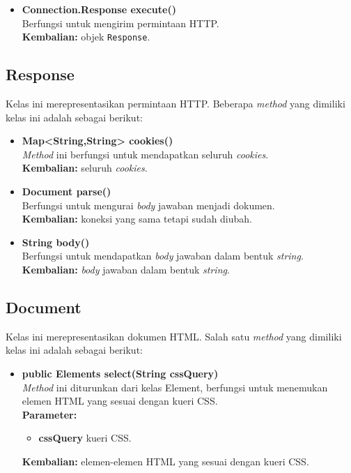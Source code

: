 \begin{itemize}
		\item \textbf{Connection.Response execute()} \\
		Berfungsi untuk mengirim permintaan HTTP.\\
		\textbf{Kembalian:} objek \texttt{Response}.	
\end{itemize}

\subsection{Response}

Kelas ini merepresentasikan permintaan HTTP. Beberapa \textit{method} yang dimiliki kelas ini adalah sebagai berikut:
\begin{itemize}
	\item \textbf{Map<String,String> cookies()} \\
		\textit{Method} ini berfungsi untuk mendapatkan seluruh \textit{cookies}. \\
		\textbf{Kembalian:} seluruh \textit{cookies}.	
		
		\item \textbf{Document parse()} \\
		Berfungsi untuk mengurai \textit{body} jawaban menjadi dokumen. \\
		\textbf{Kembalian:} koneksi yang sama tetapi sudah diubah.
		
		\item \textbf{String body()} \\
		Berfungsi untuk mendapatkan \textit{body} jawaban dalam bentuk \textit{string}. \\
		\textbf{Kembalian:} \textit{body} jawaban dalam bentuk \textit{string}.
\end{itemize}

\subsection{Document}

Kelas ini merepresentasikan dokumen HTML. Salah satu \textit{method} yang dimiliki kelas ini adalah sebagai berikut:
\begin{itemize}
	\item \textbf{public Elements select(String cssQuery)} \\
		\textit{Method} ini diturunkan dari kelas Element, berfungsi untuk menemukan elemen HTML yang sesuai dengan kueri CSS. \\
		\textbf{Parameter:} 
		\begin{itemize}
			\item \textbf{cssQuery} kueri CSS.
		\end{itemize}
		\textbf{Kembalian:} elemen-elemen HTML yang sesuai dengan kueri CSS.	
\end{itemize}

